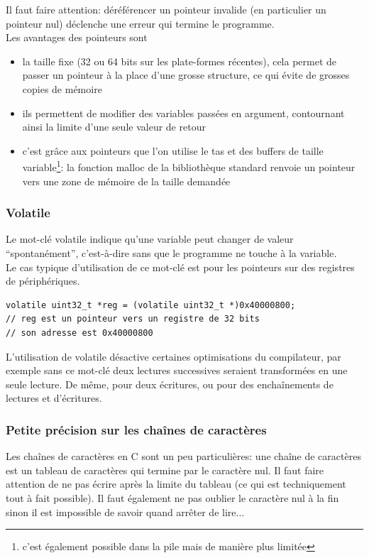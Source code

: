 \documentclass[a4paper,10pt]{article} %
\begin{document}
Il faut faire attention: déréférencer un pointeur invalide (en particulier un pointeur nul) déclenche une erreur qui termine le programme.\\

Les avantages des pointeurs sont
\begin{itemize}
\item la taille fixe (32 ou 64 bits sur les plate-formes récentes), cela permet de passer un pointeur à la place d'une grosse structure, ce qui évite de grosses copies de mémoire
\item ils permettent de modifier des variables passées en argument, contournant ainsi la limite d'une seule valeur de retour
\item c'est grâce aux pointeurs que l'on utilise le tas et des buffers de taille variable\footnote{c'est également possible dans la pile mais de manière plus limitée}: la fonction malloc de la bibliothèque standard renvoie un pointeur vers une zone de mémoire de la taille demandée
\end{itemize}

\subsubsection{Volatile}
Le mot-clé volatile indique qu'une variable peut changer de valeur ``spontanément'', c'est-à-dire sans que le programme ne touche à la variable.\\

Le cas typique d'utilisation de ce mot-clé est pour les pointeurs sur des registres de périphériques.

\begin{lstlisting}[frame=single]
volatile uint32_t *reg = (volatile uint32_t *)0x40000800;
// reg est un pointeur vers un registre de 32 bits
// son adresse est 0x40000800
\end{lstlisting}

L'utilisation de volatile désactive certaines optimisations du compilateur, par exemple sans ce mot-clé deux lectures successives seraient transformées en une seule lecture. De même, pour deux écritures, ou pour des enchaînements de lectures et d'écritures.

\subsubsection{Petite précision sur les chaînes de caractères}
Les chaînes de caractères en C sont un peu particulières: une chaîne de caractères est un tableau de caractères qui termine par le caractère nul. Il faut faire attention de ne pas écrire après la limite du tableau (ce qui est techniquement tout à fait possible). Il faut également ne pas oublier le caractère nul à la fin sinon il est impossible de savoir quand arrêter de lire...
\end{document}
